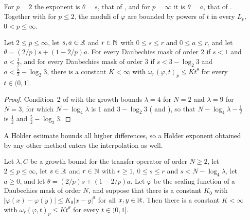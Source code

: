 For $p = 2$ the exponent is $\theta = s$, that of , and for
$p = \infty$ it is $\theta = a$, that of . Together with
 for $p \leq 2$, the moduli of $\varphi$ are bounded by powers of $t$
in every $L_p$, $0 < p \leq \infty$.

\begin{corollary}
\label{cor:daub-modulus-interp-orders-two-three}
\leanok
{}
Let $2 \leq p \leq \infty$, let $s, a \in \mathbb{R}$ and $r \in \mathbb{N}$ with $0 \leq s \leq r$ and
$0 \leq a \leq r$, and let $\theta = (2/p) s + (1 - 2/p) a$. For every Daubechies mask of order
$2$ if $s < 1$ and $a < \frac12$, and for every Daubechies mask of order $3$ if
$s < 3 - \log_2 3$ and $a < \frac52 - \log_2 3$, there is a constant $K < \infty$ with
$\omega_r(\varphi, t)_p \leq K t^\theta$ for every $t \in (0, 1]$.
\end{corollary}

\begin{proof}
\leanok
{}
Condition~2 of  with the growth bounds $\lambda = 4$ for $N = 2$
and $\lambda = 9$ for $N = 3$, for which $N - \log_4 \lambda$ is $1$ and $3 - \log_2 3$
( and ), so that
$N - \log_4 \lambda - \frac12$ is $\frac12$ and $\frac52 - \log_2 3$.
\end{proof}

A H\"older estimate bounds all higher differences, so a H\"older exponent obtained by any other
method enters the interpolation as well.

\begin{corollary}
\label{cor:daub-modulus-interp-holder}
\leanok
{}
Let $\lambda, C$ be a growth bound for the transfer operator of order $N \geq 2$, let
$2 \leq p \leq \infty$, let $s \in \mathbb{R}$ and $r \in \mathbb{N}$ with $r \geq 1$, $0 \leq s \leq r$ and
$s < N - \log_4 \lambda$, let $a \geq 0$, and let $\theta = (2/p) s + (1 - 2/p) a$. Let $\varphi$
be the scaling function of a Daubechies mask of order $N$, and suppose that there is a constant
$K_0$ with $|\varphi(x) - \varphi(y)| \leq K_0 |x - y|^a$ for all $x, y \in \mathbb{R}$. Then there is a
constant $K < \infty$ with $\omega_r(\varphi, t)_p \leq K t^\theta$ for every $t \in (0, 1]$.
\end{corollary}

